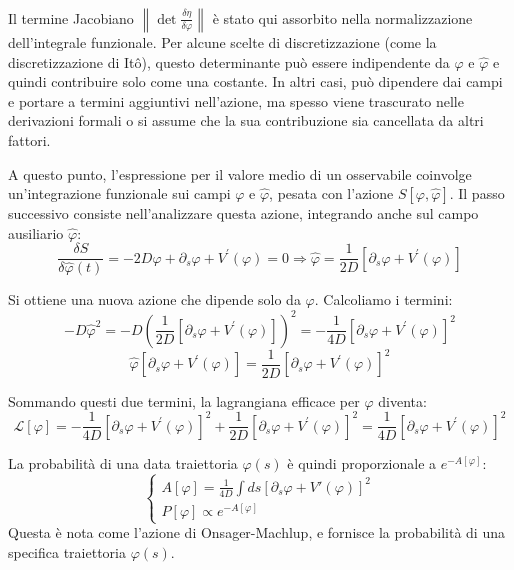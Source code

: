Il termine Jacobiano $\left\|\det\frac{\delta\eta}{\delta\varphi}\right\|$ è stato qui assorbito nella normalizzazione dell'integrale funzionale. Per alcune scelte di discretizzazione (come la discretizzazione di Itô), questo determinante può essere indipendente da $\varphi$ e $\hat{\varphi}$ e quindi contribuire solo come una costante. In altri casi, può dipendere dai campi e portare a termini aggiuntivi nell'azione, ma spesso viene trascurato nelle derivazioni formali o si assume che la sua contribuzione sia cancellata da altri fattori.

A questo punto, l'espressione per il valore medio di un osservabile coinvolge un'integrazione funzionale sui campi $\varphi$ e $\hat{\varphi}$, pesata con l'azione $S[\varphi,\hat{\varphi}]$. Il passo successivo consiste nell'analizzare questa azione, integrando anche sul campo ausiliario $\hat{\varphi}$:
\begin{equation}
\frac{\delta S}{\delta\hat{\varphi}(t)}=-2D\hat{\varphi}+\partial_{s}\varphi+V^{\prime}(\varphi)=0\Rightarrow\hat{\varphi}=\frac{1}{2D}[\partial_{s}\varphi+V^{\prime}(\varphi)]
\end{equation}

Si ottiene una nuova azione che dipende solo da $\varphi$. Calcoliamo i termini:
\begin{equation}
-D\hat{\varphi}^{2} = -D \left(\frac{1}{2D}[\partial_{s}\varphi+V^{\prime}(\varphi)]\right)^2 = -\frac{1}{4D}[\partial_{s}\varphi+V^{\prime}(\varphi)]^{2}
\end{equation}
\begin{equation}
\hat{\varphi}[\partial_{s}\varphi+V^{\prime}(\varphi)]=\frac{1}{2D}[\partial_{s}\varphi+V^{\prime}(\varphi)]^{2}
\end{equation}

Sommando questi due termini, la lagrangiana efficace per $\varphi$ diventa:
\begin{equation}
\mathcal{L}[\varphi] = -\frac{1}{4D}[\partial_{s}\varphi+V^{\prime}(\varphi)]^{2} + \frac{1}{2D}[\partial_{s}\varphi+V^{\prime}(\varphi)]^{2} = \frac{1}{4D}[\partial_{s}\varphi+V^{\prime}(\varphi)]^{2} 
\end{equation}

La probabilità di una data traiettoria $\varphi(s)$ è quindi proporzionale a $e^{-A[\varphi]}$:
\begin{equation}
\begin{cases}
A[\varphi] = \frac{1}{4D} \int ds \left[ \partial_s \varphi + V'(\varphi) \right]^2 \\
P[\varphi] \propto e^{-A[\varphi]}
\end{cases}
\end{equation}
Questa è nota come l'azione di Onsager-Machlup, e fornisce la probabilità di una specifica traiettoria $\varphi(s)$.

